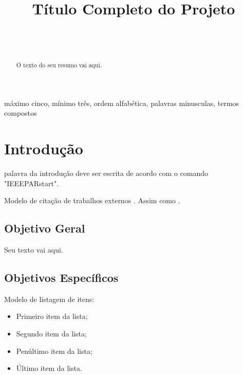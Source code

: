 \documentclass[journal]{IEEEtran}									%
\title{Título Completo do Projeto}
\author{
	\IEEEauthorblockN{Carlos~J.~R.~Chagas\IEEEauthorrefmark{1},}		%
	\IEEEauthorblockN{Oswaldo~G.~Cruz\IEEEauthorrefmark{1},}			%
	\IEEEauthorblockN{Cesare~M.~G.~Lattes\IEEEauthorrefmark{2}}\\		%
	\IEEEauthorblockA{\IEEEauthorrefmark{1}Universidade~Federal~do~Rio~de~Janeiro,~Brasil\\	%
		\{cchagas, gcruz\}@ufrj.edu.br}\\								%
	\IEEEauthorblockA{\IEEEauthorrefmark{2}Centro~Brasileiro~de~Pesquisas~Físicas\\			%
		lattes@cbpf.br}													%
}
\begin{document}

\maketitle 	%

\begin{abstract}
O texto do seu resumo vai aqui.
\end{abstract}

\begin{IEEEkeywords}
máximo cinco, mínimo três, ordem alfabética, palavras minusculas, termos compostos
\end{IEEEkeywords}

\section{Introdução}
 palavra da introdução deve ser escrita de acordo com o comando "IEEEPARstart".

Modelo de citação de trabalhos externos \cite{Pmi2008}. Assim como \cite{Kahale2008}.	%

\subsection{Objetivo Geral}
Seu texto vai aqui.

\subsection{Objetivos Específicos}
Modelo de listagem de itens:

\begin{itemize}
\item Primeiro item da lista;
\item Segundo item da lista;
\item Penúltimo item da lista;
\item Último item da lista.
\end{itemize}

\end{document}
